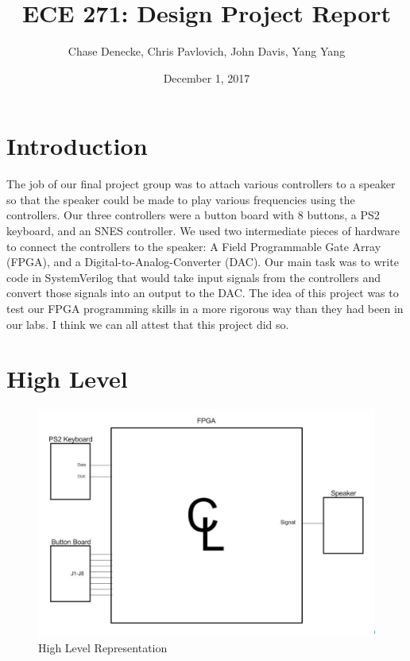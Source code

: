 \documentclass[a4paper]{article}
\title{ECE 271: Design Project Report}
\author{Chase Denecke, Chris Pavlovich, John Davis, Yang Yang}
\date{December 1, 2017}
\begin{document}
\maketitle

\section{Introduction}
The job of our final project group was to attach various controllers to a speaker so that the speaker could be made to play various frequencies using the controllers. Our three controllers were a button board with 8 buttons, a PS2 keyboard, and an SNES controller. We used two intermediate pieces of hardware to connect the controllers to the speaker: A Field Programmable Gate Array (FPGA), and a Digital-to-Analog-Converter (DAC). Our main task was to write code in SystemVerilog that would take input signals from the controllers and convert those signals into an output to the DAC.
\newline\newline
The idea of this project was to test our FPGA programming skills in a more rigorous way than they had been in our labs. I think we can all attest that this project did so.  


\section{High Level}

\begin{figure}[h]
    \includegraphics[width=6 in]{./Images/jackPictures/highLevel.png}
    \caption{High Level Representation}
    \label{fig:1}
\end{figure}
\end{document}
